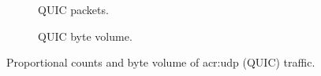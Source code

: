 \begin{figure}
	\centering
	\begin{subfigure}{\linewidth}
		\centering
		\caption{QUIC packets.}
	\end{subfigure}
	\begin{subfigure}{\linewidth}
		\centering
		\caption{QUIC byte volume.}
	\end{subfigure}
	\caption[Proportional counts and byte volume of UDP (QUIC) traffic.]{Proportional counts and byte volume of \gls{acr:udp} (QUIC) traffic.\label{fig:caida-quic}}
\end{figure}